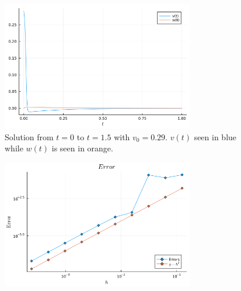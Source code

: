 \documentclass[12pt]{report}
\begin{document}
\begin{solution}
\begin{figure}[H]
        \includegraphics[width=0.75\textwidth,height=\textwidth,keepaspectratio]{images/2-sol2.png}
        \caption{Solution from $t=0$ to $t=1.5$ with $v_0 = 0.29$. $v(t)$ seen in blue while $w(t)$ is seen in orange. }
        \label{2sol2}
    \end{figure}
    \begin{figure}[H]
        \centering
        \includegraphics[width=0.75\textwidth,height=\textwidth,keepaspectratio]{images/2-err.png}

\end{figure}
\end{solution}
\end{document}

